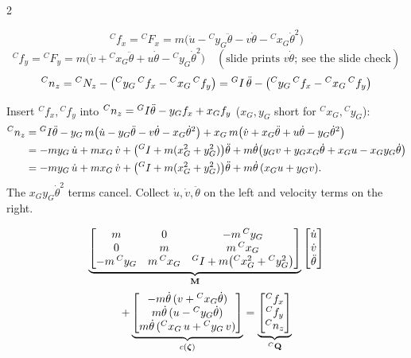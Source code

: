 \begin{multicols}{2}
\begin{fbx}
\[{}^Cf_x={}^CF_x=m\big(\dot u-{}^Cy_G\ddot\theta-v\dot\theta-{}^Cx_G\dot\theta^2\big)\]
\[{}^Cf_y={}^CF_y=m\big(\dot v+{}^Cx_G\ddot\theta+u\dot\theta-{}^Cy_G\dot\theta^2\big)\quad(\text{slide prints }v\dot\theta;\ \text{see the slide check})\]
\[{}^Cn_z={}^CN_z-\big({}^Cy_G\,{}^Cf_x-{}^Cx_G\,{}^Cf_y\big)={}^{G}I\,\ddot\theta-\big({}^Cy_G\,{}^Cf_x-{}^Cx_G\,{}^Cf_y\big)\]
\end{fbx}
\begin{deriv}
Insert ${}^Cf_x,{}^Cf_y$ into ${}^Cn_z={}^{G}I\ddot\theta-y_Gf_x+x_Gf_y$ ($x_G,y_G$ short for ${}^Cx_G,{}^Cy_G$):
\begin{align*}
{}^Cn_z&={}^{G}I\ddot\theta-y_G\,m\big(\dot u-y_G\ddot\theta-v\dot\theta-x_G\dot\theta^2\big)+x_G\,m\big(\dot v+x_G\ddot\theta+u\dot\theta-y_G\dot\theta^2\big)\\
&=-my_G\,\dot u+mx_G\,\dot v+\big({}^{G}I+m(x_G^2+y_G^2)\big)\ddot\theta+m\dot\theta\big(y_Gv+y_Gx_G\dot\theta+x_Gu-x_Gy_G\dot\theta\big)\\
&=-my_G\,\dot u+mx_G\,\dot v+\big({}^{G}I+m(x_G^2+y_G^2)\big)\ddot\theta+m\dot\theta\,(x_Gu+y_Gv).
\end{align*}
The $x_Gy_G\dot\theta^2$ terms cancel. Collect $\dot u,\dot v,\ddot\theta$ on the left and velocity terms on the right.
\end{deriv}
\begin{fbx}[Matrix form $\mathbf M\dot{\wEz}+c(\wEz)=\wEQC$ \pg{26}]
\[\underbrace{\begin{bmatrix}m&0&-m\,{}^Cy_G\\0&m&m\,{}^Cx_G\\-m\,{}^Cy_G&m\,{}^Cx_G&{}^{G}I+m\big({}^Cx_G^2+{}^Cy_G^2\big)\end{bmatrix}}_{\mathbf M}\begin{bmatrix}\dot u\\\dot v\\\ddot\theta\end{bmatrix}\]
\[+\underbrace{\begin{bmatrix}-m\dot\theta\,(v+{}^Cx_G\dot\theta)\\m\dot\theta\,(u-{}^Cy_G\dot\theta)\\m\dot\theta\,({}^Cx_G\,u+{}^Cy_G\,v)\end{bmatrix}}_{c(\boldsymbol\zeta)}=\underbrace{\begin{bmatrix}{}^Cf_x\\{}^Cf_y\\{}^Cn_z\end{bmatrix}}_{{}^{C}\mathbf Q}\]

\end{fbx}
\end{multicols}

